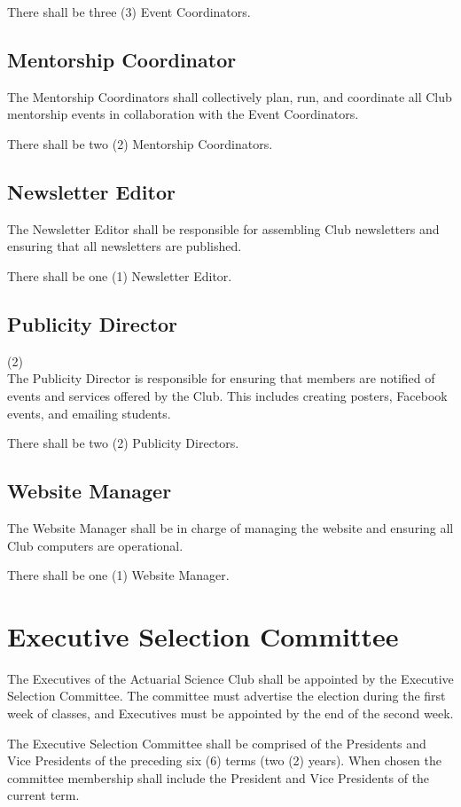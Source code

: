 \documentclass[11pt]{mathsoc}
\begin{document}
There shall be three (3) Event Coordinators.

\subsection{Mentorship Coordinator}
The Mentorship Coordinators shall collectively plan, run, and coordinate all 
Club mentorship events in collaboration with the Event Coordinators.

There shall be two (2) Mentorship Coordinators.

\subsection{Newsletter Editor}
The Newsletter Editor shall be responsible for assembling Club newsletters
and ensuring that all newsletters are published.

There shall be one (1) Newsletter Editor.

\subsection{Publicity Director} (2)\\
The Publicity Director is responsible for ensuring that members are notified 
of events and services offered by the Club. This includes creating posters, 
Facebook events, and emailing students. 

There shall be two (2) Publicity Directors.

\subsection{Website Manager} 
The Website Manager shall be in charge of managing the website and ensuring 
all Club computers are operational.

There shall be one (1) Website Manager.

\section{Executive Selection Committee}
The Executives of the Actuarial Science Club shall be appointed by the 
Executive Selection Committee. The committee must advertise the election
during the first week of classes, and Executives must be appointed by the end
of the second week.

The Executive Selection Committee shall be comprised of the Presidents and Vice 
Presidents of the preceding six (6) terms (two (2) years). When chosen the committee membership
shall include the President and Vice Presidents of the current term.
\end{document}
